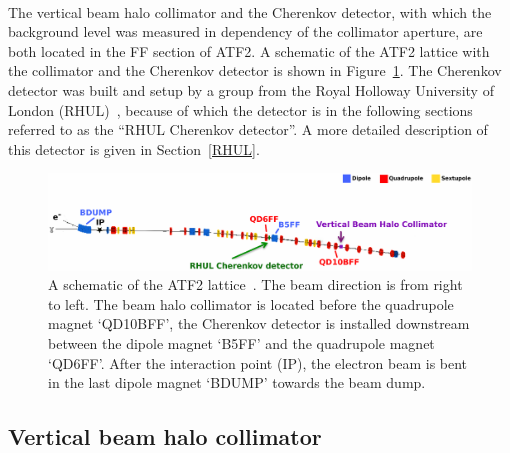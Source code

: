 \\The vertical beam halo collimator and the Cherenkov detector, with which the background level was measured in dependency of the collimator aperture, are both located in the FF section of ATF2. 
A schematic of the ATF2 lattice with the collimator and the Cherenkov detector is shown in Figure~\ref{fig:ATF2}. 
The Cherenkov detector was built and setup by a group from the Royal Holloway University of London (RHUL)~\cite{RHUL_detector_wiki}, because of which the detector is in the following sections referred to as the ``RHUL Cherenkov detector''.
A more detailed description of this detector is given in Section~\ref{RHUL}.
\begin{figure}
\centering
\includegraphics[width=\textwidth]{Figures/ATF/ATF2schematic.pdf}
\caption[ATF2 schematic]{A schematic of the ATF2 lattice~\cite{Nuria}. 
The beam direction is from right to left. 
The beam halo collimator is located before the quadrupole magnet `QD10BFF', the Cherenkov detector is installed downstream between the dipole magnet `B5FF' and the quadrupole magnet `QD6FF'. 
After the interaction point (IP), the electron beam is bent in the last dipole magnet `BDUMP' towards the beam dump. 
}
\label{fig:ATF2}
\end{figure}

\subsection{Vertical beam halo collimator}
\label{Collimator}

